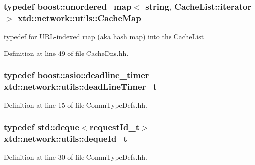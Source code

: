 \hypertarget{namespacextd_1_1network_1_1utils_aa648e4975dce81f2fd0a9999f684781d}{
\subsubsection[{Cache\-Map}]{\setlength{\rightskip}{0pt plus 5cm}typedef boost\-::unordered\-\_\-map$<$ string, Cache\-List\-::iterator $>$ {\bf xtd\-::network\-::utils\-::\-Cache\-Map}}}\label{namespacextd_1_1network_1_1utils_aa648e4975dce81f2fd0a9999f684781d}


typedef for U\-R\-L-\/indexed map (aka hash map) into the Cache\-List 



Definition at line 49 of file Cache\-Dns.\-hh.

\hypertarget{namespacextd_1_1network_1_1utils_af551b4a44731a154a57b9447dac595cd}{
\subsubsection[{dead\-Line\-Timer\-\_\-t}]{\setlength{\rightskip}{0pt plus 5cm}typedef boost\-::asio\-::deadline\-\_\-timer {\bf xtd\-::network\-::utils\-::dead\-Line\-Timer\-\_\-t}}}\label{namespacextd_1_1network_1_1utils_af551b4a44731a154a57b9447dac595cd}


Definition at line 15 of file Comm\-Type\-Defs.\-hh.

\hypertarget{namespacextd_1_1network_1_1utils_ac3ca189267ad1167fa141608f8b3a2de}{
\subsubsection[{deque\-Id\-\_\-t}]{\setlength{\rightskip}{0pt plus 5cm}typedef std\-::deque$<${\bf request\-Id\-\_\-t}$>$ {\bf xtd\-::network\-::utils\-::deque\-Id\-\_\-t}}}\label{namespacextd_1_1network_1_1utils_ac3ca189267ad1167fa141608f8b3a2de}


Definition at line 30 of file Comm\-Type\-Defs.\-hh.

